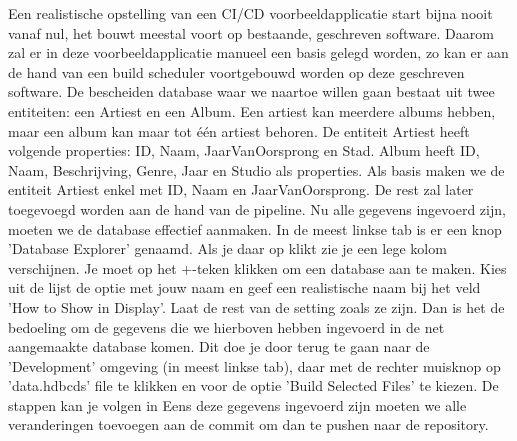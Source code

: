             Een realistische opstelling van een CI/CD voorbeeldapplicatie start bijna nooit vanaf nul, het bouwt meestal voort op bestaande, geschreven software.
            Daarom zal er in deze voorbeeldapplicatie manueel een basis gelegd worden, zo kan er aan de hand van een build scheduler voortgebouwd worden op deze geschreven software.
            De bescheiden database waar we naartoe willen gaan bestaat uit twee entiteiten: een Artiest en een Album. Een artiest kan meerdere albums hebben, maar een album kan maar tot één artiest behoren. De entiteit Artiest heeft volgende properties: ID, Naam, JaarVanOorsprong en Stad. Album heeft ID, Naam, Beschrijving, Genre, Jaar en Studio als properties. Als basis maken we de entiteit Artiest enkel met ID, Naam en JaarVanOorsprong. De rest zal later toegevoegd worden aan de hand van de pipeline.
            Nu alle gegevens ingevoerd zijn, moeten we de database effectief aanmaken. In de meest linkse tab is er een knop 'Database Explorer' genaamd. Als je daar op klikt zie je een lege kolom verschijnen. Je moet op het +-teken klikken om een database aan te maken. Kies uit de lijst de optie met jouw naam en geef een realistische naam bij het veld 'How to Show in Display'. Laat de rest van de setting zoals ze zijn.
            Dan is het de bedoeling om de gegevens die we hierboven hebben ingevoerd in de net aangemaakte database komen. Dit doe je door terug te gaan naar de 'Development' omgeving (in meest linkse tab), daar met de rechter muisknop op 'data.hdbcds' file te klikken en voor de optie 'Build Selected Files' te kiezen. De stappen kan je volgen in %
            Eens deze gegevens ingevoerd zijn moeten we alle veranderingen toevoegen aan de commit om dan te pushen naar de repository.
    
